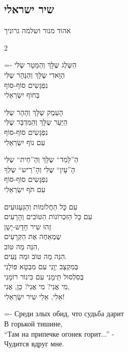 \documentclass[11pt,twoside]{article}
\newcommand{\instruction}[1]{%
\ifhmode\else\noindent\fi%
{\plain\tiny{#1}}%
}
\begin{document}
{{\subsection{שיר ישראלי}
\vspace{-\baselineskip}%
{\centering\instruction{אהוד מנור ושלמה גרוניך}\par}

{%
\setlength{\columnsep}{0.5em}%
\scriptsize%
\begin{multicols}{2}
{
\lineskiplimit=-\maxdimen%
הַשֶּלֶג שֶלָּךְ וְהַמָּטָר שֶלִּי\\
הַוָּאדִי שֶלָּךְ וְהַנָּהָר שֶלִּי\\
נִפְגָּשִים סוֹף-סוֹף\\
בְּחוֹף יִשְׂרְאֵלִי

הָעֵמֶק שֶלָּךְ וְהָהָר שֶלִּי\\
הַיַּעַר שֶלָּךְ וְהַמִּדְבָּר שֶלִּי\\
נִפְגָּשִים סוֹף-סוֹף\\
עִם נוֹף יִשְׂרְאֵלִי%

הַ”לָּמֵד“ שֶלָּךְ וְהַ”חֵית“ שֶלִּי\\
הָ”עָיִן“ שֶלִּי וְהָ”רֵיש“ שֶלְּךָ\\
נִפְגָּשִים סוֹף-סוֹף\\
עִם תֹּף יִשְׂרְאֵלִי%
\par
}

{\footnotesize%
עִם כָּל הַחֲלוֹמוֹת וְהַגַּעְגּוּעִים\\
עִם כָּל הַזִּכְרוֹנוֹת הַטּוֹבִים וְהָרָעִים\\
זֶהוּ שִיר חָדָש-יָשָן\\
שֶמְאַחֶה אֶת הַקְּרָעִים\\
הִנֵּה מַה טּוֹב,\\
הִנֵּה מַה טּוֹב וּמַה נַּעִים.\\
בְּמִקְצָב יְוָנִי עִם מִבְטָא פּוֹלָנִי\\
בְּסִלְסוּל תֵּימָנִי עִם כִּינוֹר רוֹמָנִי\\
מִי אֲנִי? מִי אֲנִי? \textemdash{} כֵּן, אֲנִי,\\
אֵלִי, אֵלִי \textemdash{} שִיר יִשְׂרְאֵלִי!
}
\end{multicols}
}

\newpage


\begin{russian}
\fontsize{8}{9}%
\lineskiplimit=-\maxdimen%
\selectfont%
Среди злых обид, что судьба дарит\\
В горькой тишине,\\
“Там на припечке огонек горит...” -\\
Чудится вдруг мне.


\end{russian}}}
\end{document}
